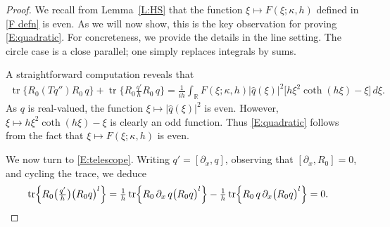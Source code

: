 \documentclass{amsart}
\newcommand{\R}{{\mathbb{R}}}
\DeclareMathOperator{\tr}{tr}
\theoremstyle{definition}
\theoremstyle{remark}
\begin{document}
\begin{proof}
We recall from Lemma~\ref{L:HS} that the function $\xi\mapsto F(\xi; \kappa,h)$ defined in \eqref{F defn} is even.  As we will now show, this is the key observation for proving \eqref{E:quadratic}.  For concreteness, we provide the details in the line setting. The circle case is a close parallel; one simply replaces integrals by sums.

A straightforward computation reveals that
\begin{align*}
\tr\bigl\{  R_0 (Tq'') R_0 \,q\bigr\} + \tr\bigl\{ R_0 \tfrac{q'}{h} R_0 \,q\bigr\}= \tfrac1{ih}\int_\R F(\xi;\kappa,h)  |\widehat q(\xi)|^2\bigl[ h\xi^2\coth(h\xi) - \xi\bigr]\, d\xi.
\end{align*}
As $q$ is real-valued, the function $\xi\mapsto |\widehat q(\xi)|^2$ is even.  However, $\xi\mapsto h\xi^2\coth(h\xi) - \xi$ is clearly an odd function.  Thus \eqref{E:quadratic} follows from the fact that $\xi\mapsto F(\xi; \kappa,h)$ is even.

We now turn to \eqref{E:telescope}. Writing $q'=[\partial_x,q]$, observing that $[\partial_x,R_0]=0$, and cycling the trace, we deduce
\begin{align}\label{easy}
\tr\Bigl\{ R_0  \bigl(\tfrac{q'}{h}\bigr)\bigl(R_0 q\bigr)^{l}\Bigr\}
&= \tfrac1h\tr\Bigl\{ R_0\, \partial_x \,q\bigl(R_0 q\bigr)^{l}\Bigr\}- \tfrac1h\tr\Bigl\{ R_0 \, q\,\partial_x\bigl(R_0 q\bigr)^{l}\Bigr\} =0.
\end{align}


\end{proof}
\end{document}
